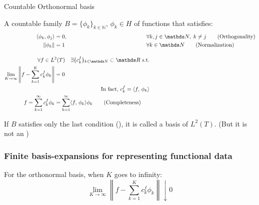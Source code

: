 \begin{definition}{Countable Orthonormal basis}{}

	A countable family $B = \{\phi_k\}_{k\in\mathds N},\, \phi_k\in{}H$ of functions
	that satisfies:
	\begin{alignat*}{2}
		\langle \phi_k, \phi_j\rangle        & = 0, \quad                                              & \forall & k,j \in \mathds N,\; k\neq j
		\tag{Orthogonality}                                                                                                                            \\
		\lVert \phi_k \rVert                 & = 1 \quad                                               & \forall & k \in \mathds N \tag{Normalization} \\[1em]
		\span\span\forall f\in L^2(T)\quad \exists \{c_k^f\}_{k\in\mathds N} \subset \mathds R \text{ s.t.}                                            \\
		\lim_{K\to\infty} \left\lVert
		f - \sum_{k=1}^{K} c_k^f \phi_k
		\right\rVert                         & = 0                                                                                                     \\
		\span\span\text{In fact, } c_k^f = \langle f,\, \phi_k\rangle                                                                                  \\
		f = \sum_{k=1}^{\infty} c_k^f \phi_k & = \sum_{k=1}^{\infty} \langle f,\, \phi_k\rangle \phi_k
		\tag{Completeness}
	\end{alignat*}
	\tcblower
	\begin{note}
		If $B$ satisfies only the last condition (),
        it is called a basis of $L^2(T)$. (But it is not an )
	\end{note}
\end{definition}

\subsubsection{Finite basis-expansions for representing functional data}

For the orthonormal basis, when $K$ goes to infinity:
\begin{equation*}
    \lim_{K\to\infty} \left\lVert
    f - \sum_{k=1}^{K} c_k^f \phi_k
    \right\rVert \downarrow 0
\end{equation*}

